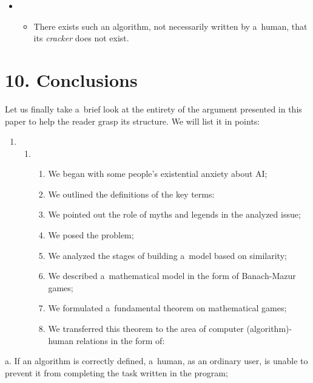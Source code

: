 {\begin{itemize}
\item \begin{itemize}
\item There exists such an algorithm, not necessarily written by a~human, that its \textit{cracker} does not exist.
\end{itemize}
\end{itemize}
\section{10. Conclusions}
Let us finally take a~brief look at the entirety of the argument presented in this paper to help the reader grasp its structure. We will list it in points:

\begin{enumerate}
\item \begin{enumerate}
\item \begin{enumerate}
\item We began with some people's existential anxiety about AI;
\item We outlined the definitions of the key terms:
\item We pointed out the role of myths and legends in the analyzed issue;
\item We posed the problem;
\item We analyzed the stages of building a~model based on similarity;
\item We described a~mathematical model in the form of Banach-Mazur games;
\item We formulated a~fundamental theorem on mathematical games;
\item We transferred this theorem to the area of computer (algorithm)-human relations in the form of:
\end{enumerate}
\end{enumerate}
\end{enumerate}
a. If an algorithm is correctly defined, a~human, as an ordinary user, is unable to prevent it from completing the task written in the program;

}
